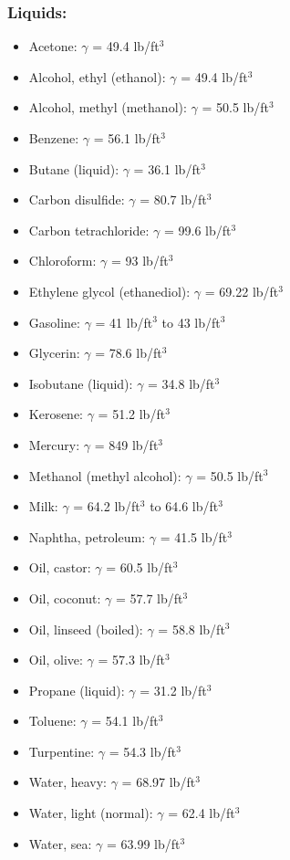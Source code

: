 \subsubsection{Liquids:}

\begin{itemize}
\item Acetone: $\gamma$ = 49.4 lb/ft$^{3}$
\item Alcohol, ethyl (ethanol): $\gamma$ = 49.4 lb/ft$^{3}$
\item Alcohol, methyl (methanol): $\gamma$ = 50.5 lb/ft$^{3}$
\item Benzene: $\gamma$ = 56.1 lb/ft$^{3}$
\item Butane (liquid): $\gamma$ = 36.1 lb/ft$^{3}$
\item Carbon disulfide: $\gamma$ = 80.7 lb/ft$^{3}$
\item Carbon tetrachloride: $\gamma$ = 99.6 lb/ft$^{3}$
\item Chloroform: $\gamma$ = 93 lb/ft$^{3}$
\item Ethylene glycol (ethanediol): $\gamma$ = 69.22 lb/ft$^{3}$
\item Gasoline: $\gamma$ = 41 lb/ft$^{3}$ to 43 lb/ft$^{3}$
\item Glycerin: $\gamma$ = 78.6 lb/ft$^{3}$
\item Isobutane (liquid): $\gamma$ = 34.8 lb/ft$^{3}$
\item Kerosene: $\gamma$ = 51.2 lb/ft$^{3}$
\item Mercury: $\gamma$ = 849 lb/ft$^{3}$
\item Methanol (methyl alcohol): $\gamma$ = 50.5 lb/ft$^{3}$
\item Milk: $\gamma$ = 64.2 lb/ft$^{3}$ to 64.6 lb/ft$^{3}$
\item Naphtha, petroleum: $\gamma$ = 41.5 lb/ft$^{3}$
\item Oil, castor: $\gamma$ = 60.5 lb/ft$^{3}$
\item Oil, coconut: $\gamma$ = 57.7 lb/ft$^{3}$
\item Oil, linseed (boiled): $\gamma$ = 58.8 lb/ft$^{3}$
\item Oil, olive: $\gamma$ = 57.3 lb/ft$^{3}$
\item Propane (liquid): $\gamma$ = 31.2 lb/ft$^{3}$
\item Toluene: $\gamma$ = 54.1 lb/ft$^{3}$
\item Turpentine: $\gamma$ = 54.3 lb/ft$^{3}$
\item Water, heavy: $\gamma$ = 68.97 lb/ft$^{3}$
\item Water, light (normal): $\gamma$ = 62.4 lb/ft$^{3}$
\item Water, sea: $\gamma$ = 63.99 lb/ft$^{3}$
\end{itemize}

